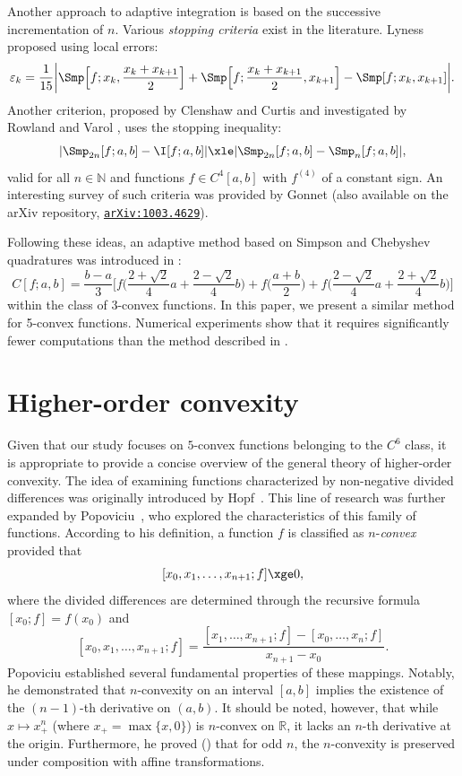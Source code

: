 \documentclass[12pt]{amsart}
\theoremstyle{definition}
\begin{document}
Another approach to adaptive integration is based on the successive incrementation of $n$. Various \emph{stopping criteria} exist in the literature. Lyness \cite{Lyn69} proposed using local errors:
\[
\varepsilon_k = \frac{1}{15} \biggl| \Smp\Bigl[f;x_k, \frac{x_k+x_{k+1}}{2}\Bigr] + \Smp\Bigl[f; \frac{x_k+x_{k+1}}{2}, x_{k+1}\Bigr] - \Smp[f;x_k, x_{k+1}] \biggr|.
\]
Another criterion, proposed by Clenshaw and Curtis \cite{CleCur60} and investigated by Rowland and Varol \cite{RowVar72}, uses the stopping inequality:
\[
|\Smp_{2n}[f;a,b] - \I[f;a,b]| \xle |\Smp_{2n}[f;a,b] - \Smp_n[f;a,b]|,
\]
valid for all $n \in \mathbb{N}$ and functions $f \in C^4[a,b]$ with $f^{(4)}$ of a constant sign. An interesting survey of such criteria was provided by Gonnet \cite{Gon12} (also available on the arXiv repository, 	\href{https://arxiv.org/abs/1003.4629}{\texttt{arXiv:1003.4629}}).

Following these ideas, an adaptive method based on Simpson and Chebyshev quadratures was introduced in \cite{Was20}:
\[
C[f;a,b] = \frac{b-a}{3} \biggl[ f\biggl(\frac{2+\sqrt{2}}{4}a + \frac{2-\sqrt{2}}{4}b\biggr) + f\biggl(\frac{a+b}{2}\biggr) + f\biggl(\frac{2-\sqrt{2}}{4}a + \frac{2+\sqrt{2}}{4}b\biggr) \biggr]
\]
within the class of 3-convex functions. In this paper, we present a similar method for 5-convex functions. Numerical experiments show that it requires significantly fewer computations than the method described in \cite{Was20}.

\section{Higher-order convexity}

Given that our study focuses on $5$-convex functions belonging to the $C^6$ class, it is appropriate to provide a concise overview of the general theory of higher-order convexity. The idea of examining functions characterized by non-negative divided differences was originally introduced by Hopf~\cite{Hop26}. This line of research was further expanded by Popoviciu~\cite{Pop34, Pop44}, who explored the characteristics of this family of functions. According to his definition, a function $f$ is classified as $n$-\emph{convex} provided that
\[
 [x_0, x_1, \dots, x_{n+1}; f] \xge 0,
\]
where the divided differences are determined through the recursive formula $[x_0; f] = f(x_0)$ and
\[
 [x_0, x_1, \dots, x_{n+1}; f] = \frac{[x_1, \dots, x_{n+1}; f] - [x_0, \dots, x_n; f]}{x_{n+1} - x_0}.
\]
Popoviciu established several fundamental properties of these mappings. Notably, he demonstrated that $n$-convexity on an interval $[a, b]$ implies the existence of the $(n-1)$-th derivative on $(a, b)$. It should be noted, however, that while $x \mapsto x^n_+$ (where $x_+ = \max\{x, 0\}$) is $n$-convex on $\mathbb{R}$, it lacks an $n$-th derivative at the origin. Furthermore, he proved (\cite[p.~18]{Pop34}) that for odd $n$, the $n$-convexity is preserved under composition with affine transformations. 
\end{document}
